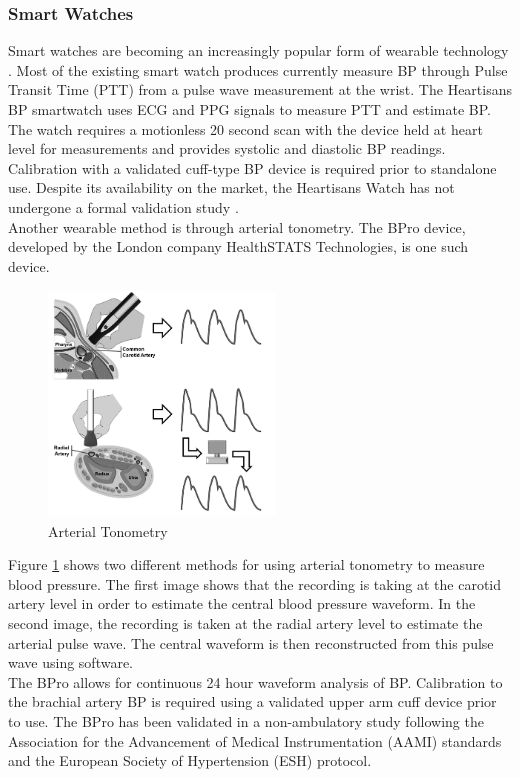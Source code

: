 \subsubsection{Smart Watches}
Smart watches are becoming an increasingly popular form of wearable technology \cite{Bard2019}. Most of the existing smart
 watch produces currently measure BP through Pulse Transit Time (PTT) from a pulse wave measurement at the wrist. The Heartisans 
 BP smartwatch uses ECG and PPG signals to measure PTT and estimate BP. The watch requires a motionless 20 second scan with 
 the device held at heart level for measurements and provides systolic and diastolic BP readings. Calibration with a
  validated cuff-type BP device is required prior to standalone use. Despite its availability on the market, the 
  Heartisans Watch has not undergone a formal validation study \cite{Bard2019}. \\ \newline \noindent Another wearable 
  method  is  through  arterial  tonometry. The BPro device, developed by the London company HealthSTATS Technologies, 
  is one such device.
\begin{figure}[H]
    \centering
    \includegraphics[width=6cm,height=6cm,keepaspectratio]{Background/arterial.png}
    \caption{Arterial Tonometry}
    \label{tonometry}
\end{figure} \noindent Figure \ref{tonometry} shows two different methods for using arterial 
tonometry to measure blood pressure. The first image shows that the recording is taking at the carotid 
artery level in order to estimate the central blood pressure waveform. In the second image, the recording 
is taken at the radial artery level to estimate the arterial pulse wave. The central waveform is then 
reconstructed from this pulse wave using software. \\ \newline \noindent The BPro allows for continuous  24 hour 
 waveform  analysis  of  BP. Calibration to the brachial artery BP is required using a validated upper arm cuff 
 device prior to use. The BPro has been validated in a non-ambulatory study following the Association for the 
 Advancement of Medical Instrumentation (AAMI) standards and the European Society of Hypertension (ESH) protocol.

